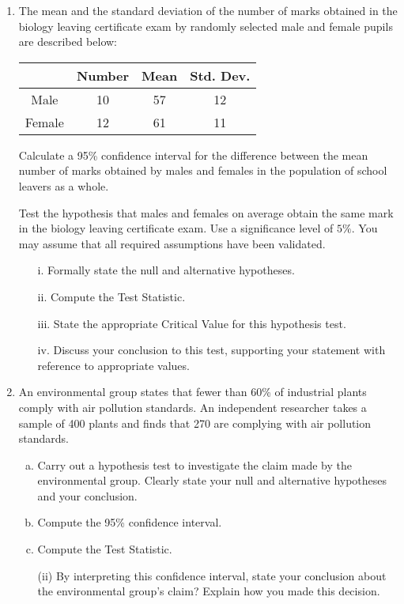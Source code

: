\documentclass[a4paper,12pt]{article}
\begin{document}
\begin{enumerate}
\item The mean and the standard deviation of the number of marks obtained in the biology leaving certificate exam by randomly selected male and female pupils are described below:\\
\begin{center}
\begin{tabular}{|c|c|c|c|}

  \hline
	&Number&	Mean&	Std. Dev.\\ \hline
Male	&10	&57	&12\\
Female	&12	&61	&11\\
  \hline
\end{tabular}
\end{center}

Calculate a 95\% confidence interval for the difference between the mean number of marks obtained by males and females in the population of school leavers as a whole.

Test the hypothesis that males and females on average obtain the same mark in the biology leaving certificate exam. Use a significance level of $5\%$. You may assume that all required assumptions have been validated.\\%
\bigskip
\begin{itemize}
\item[i.] Formally state the null and alternative hypotheses.
\item[ii.] Compute the Test Statistic.
\item[iii.] State the appropriate Critical Value for this hypothesis test.
\item[iv.] Discuss your conclusion to this test, supporting your statement with reference to appropriate values.
\end{itemize}

    \item 
    

An environmental group states that fewer than 60\% of industrial plants comply with air pollution standards. An independent researcher takes a sample of 400 plants and finds that 270 are complying with air pollution standards. 
\begin{enumerate}[(a)]
	\item  Carry out a hypothesis test to investigate the claim made by the environmental group. Clearly state your null and alternative hypotheses and your conclusion.
	\item Compute the 95\% confidence interval.
	\item Compute the Test Statistic.
	\item[(ii)] By interpreting this confidence interval, state your conclusion about the environmental group's claim? Explain how you made this decision.
\end{enumerate}


\end{enumerate}
\end{document}
